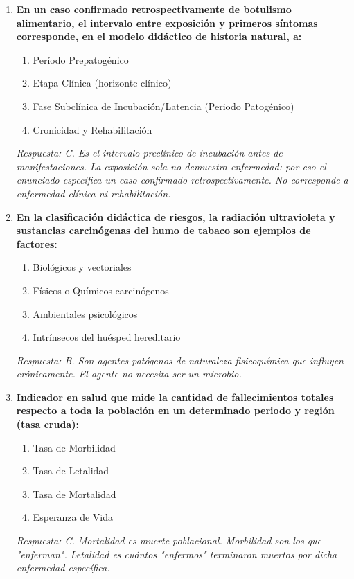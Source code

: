 \begin{enumerate}[label=\textbf{\arabic*.}]
    \item \textbf{En un caso confirmado retrospectivamente de botulismo alimentario, el intervalo entre exposición y primeros síntomas corresponde, en el modelo didáctico de historia natural, a:}
    \begin{enumerate}
        \item[A)] Período Prepatogénico
        \item[B)] Etapa Clínica (horizonte clínico)
        \item[C)] Fase Subclínica de Incubación/Latencia (Periodo Patogénico)
        \item[D)] Cronicidad y Rehabilitación
    \end{enumerate}
    \textit{Respuesta: C. Es el intervalo preclínico de incubación antes de manifestaciones. La exposición sola no demuestra enfermedad: por eso el enunciado especifica un caso confirmado retrospectivamente. No corresponde a enfermedad clínica ni rehabilitación.}

    \item \textbf{En la clasificación didáctica de riesgos, la radiación ultravioleta y sustancias carcinógenas del humo de tabaco son ejemplos de factores:}
    \begin{enumerate}
        \item[A)] Biológicos y vectoriales
        \item[B)] Físicos o Químicos carcinógenos
        \item[C)] Ambientales psicológicos
        \item[D)] Intrínsecos del huésped hereditario
    \end{enumerate}
    \textit{Respuesta: B. Son agentes patógenos de naturaleza fisicoquímica que influyen crónicamente. El agente no necesita ser un microbio.}

    \item \textbf{Indicador en salud que mide la cantidad de fallecimientos totales respecto a toda la población en un determinado periodo y región (tasa cruda):}
    \begin{enumerate}
        \item[A)] Tasa de Morbilidad
        \item[B)] Tasa de Letalidad
        \item[C)] Tasa de Mortalidad
        \item[D)] Esperanza de Vida
    \end{enumerate}
    \textit{Respuesta: C. Mortalidad es muerte poblacional. Morbilidad son los que "enferman". Letalidad es cuántos "enfermos" terminaron muertos por dicha enfermedad específica.}


\end{enumerate}

